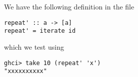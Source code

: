 
We have the following definition in the file 
\begin{verbatim}
repeat' :: a -> [a]
repeat' = iterate id
\end{verbatim}
which we test using
\begin{verbatim}
ghci> take 10 (repeat' 'x')
"xxxxxxxxxx"
\end{verbatim}
